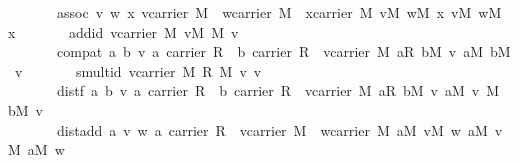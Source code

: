 \begin{isabellebody}
\ \ \ \ \ \ \ assoc{\isacharcolon}\ {\isachardoublequoteopen}{\isasymforall}v\ w\ x{\isachardot}\ v{\isasymin}carrier\ M\ {\isasymand}\ w{\isasymin}carrier\ M\ {\isasymand}\ x{\isasymin}carrier\ M{\isasymlongrightarrow}\ {\isacharparenleft}v{\isasymoplus}\isactrlbsub M\isactrlesub \ w{\isacharparenright}{\isasymoplus}\isactrlbsub M\isactrlesub \ x{\isacharequal}\ v{\isasymoplus}\isactrlbsub M\isactrlesub \ {\isacharparenleft}w{\isasymoplus}\isactrlbsub M\isactrlesub \ x{\isacharparenright}{\isachardoublequoteclose}\isanewline
\ \ \ \ \ \ \ add{\isacharunderscore}id{\isacharcolon}\ {\isachardoublequoteopen}{\isasymforall}v{\isasymin}carrier\ M{\isachardot}\ {\isacharparenleft}v{\isasymoplus}\isactrlbsub M\isactrlesub \ {\isasymzero}\isactrlbsub M\isactrlesub \ {\isacharequal}v{\isacharparenright}{\isachardoublequoteclose}\isanewline
\ \ \ \ \ \ \ compat{\isacharcolon}\ {\isachardoublequoteopen}{\isasymforall}a\ b\ v{\isachardot}\ a{\isasymin}\ carrier\ R\ {\isasymand}\ b{\isasymin}\ carrier\ R\ {\isasymand}\ v{\isasymin}carrier\ M{\isasymlongrightarrow}\ {\isacharparenleft}a{\isasymotimes}\isactrlbsub R\isactrlesub \ b{\isacharparenright}{\isasymodot}\isactrlbsub M\isactrlesub \ v\ {\isacharequal}a{\isasymodot}\isactrlbsub M\isactrlesub \ {\isacharparenleft}b{\isasymodot}\isactrlbsub M\isactrlesub \ v{\isacharparenright}{\isachardoublequoteclose}\isanewline
\ \ \ \ \ \ \ smult{\isacharunderscore}id{\isacharcolon}\ {\isachardoublequoteopen}{\isasymforall}v{\isasymin}carrier\ M{\isachardot}\ {\isacharparenleft}{\isasymone}\isactrlbsub R\isactrlesub \ {\isasymodot}\isactrlbsub M\isactrlesub \ v\ {\isacharequal}v{\isacharparenright}{\isachardoublequoteclose}\isanewline
\ \ \ \ \ \ \ dist{\isacharunderscore}f{\isacharcolon}\ {\isachardoublequoteopen}{\isasymforall}a\ b\ v{\isachardot}\ a{\isasymin}\ carrier\ R\ {\isasymand}\ b{\isasymin}\ carrier\ R\ {\isasymand}\ v{\isasymin}carrier\ M{\isasymlongrightarrow}\ {\isacharparenleft}a{\isasymoplus}\isactrlbsub R\isactrlesub \ b{\isacharparenright}{\isasymodot}\isactrlbsub M\isactrlesub \ v\ {\isacharequal}{\isacharparenleft}a{\isasymodot}\isactrlbsub M\isactrlesub \ v{\isacharparenright}\ {\isasymoplus}\isactrlbsub M\isactrlesub \ {\isacharparenleft}b{\isasymodot}\isactrlbsub M\isactrlesub \ v{\isacharparenright}{\isachardoublequoteclose}\isanewline
\ \ \ \ \ \ \ dist{\isacharunderscore}add{\isacharcolon}\ {\isachardoublequoteopen}{\isasymforall}a\ v\ w{\isachardot}\ a{\isasymin}\ carrier\ R\ {\isasymand}\ v{\isasymin}carrier\ M\ {\isasymand}\ w{\isasymin}carrier\ M{\isasymlongrightarrow}\ a{\isasymodot}\isactrlbsub M\isactrlesub \ {\isacharparenleft}v{\isasymoplus}\isactrlbsub M\isactrlesub \ w{\isacharparenright}\ {\isacharequal}{\isacharparenleft}a{\isasymodot}\isactrlbsub M\isactrlesub \ v{\isacharparenright}\ {\isasymoplus}\isactrlbsub M\isactrlesub \ {\isacharparenleft}a{\isasymodot}\isactrlbsub M\isactrlesub \ w{\isacharparenright}{\isachardoublequoteclose}\isanewline

\end{isabellebody}
